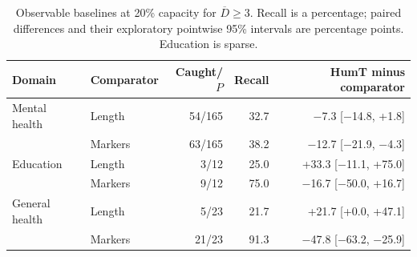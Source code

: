 \begin{table}[htbp]
\centering\small
\caption{Observable baselines at 20\% capacity for $\overline D\geq3$. Recall is a percentage; paired differences and their exploratory pointwise 95\% intervals are percentage points. Education is sparse.}
\label{tab:baselines}
\begin{tabular}{llrrr}
\toprule
Domain & Comparator & Caught/$P$ & Recall & HumT minus comparator \\
\midrule
Mental health & Length & 54/165 & 32.7 & \ensuremath{-}7.3 [\ensuremath{-}14.8, +1.8] \\
 & Markers & 63/165 & 38.2 & \ensuremath{-}12.7 [\ensuremath{-}21.9, \ensuremath{-}4.3] \\
Education & Length & 3/12 & 25.0 & +33.3 [\ensuremath{-}11.1, +75.0] \\
 & Markers & 9/12 & 75.0 & \ensuremath{-}16.7 [\ensuremath{-}50.0, +16.7] \\
General health & Length & 5/23 & 21.7 & +21.7 [+0.0, +47.1] \\
 & Markers & 21/23 & 91.3 & \ensuremath{-}47.8 [\ensuremath{-}63.2, \ensuremath{-}25.9] \\
\bottomrule
\end{tabular}
\end{table}

